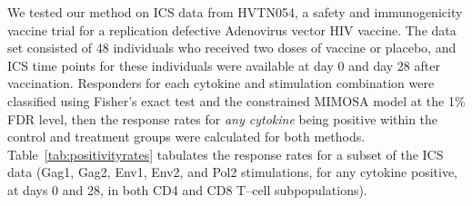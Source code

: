 \documentclass[11pt]{article}
\begin{document}
We tested our method on ICS data from HVTN054, a safety and immunogenicity vaccine trial for a replication defective Adenovirus vector HIV vaccine. The data set consisted of 48 individuals who received two doses of vaccine or placebo, and ICS time points for these individuals were available at day 0 and day 28 after vaccination. Responders for each cytokine and stimulation combination were classified using Fisher's exact test and the constrained MIMOSA model at the 1\% FDR level, then the response rates for \textit{any cytokine} being positive within the control and treatment groups were calculated for both methods. Table~\ref{tab:positivityrates} tabulates the response rates for a subset of the ICS data (Gag1, Gag2, Env1, Env2, and Pol2 stimulations, for any cytokine positive, at days 0 and 28, in both CD4 and CD8 T--cell subpopulations). 
\end{document}
